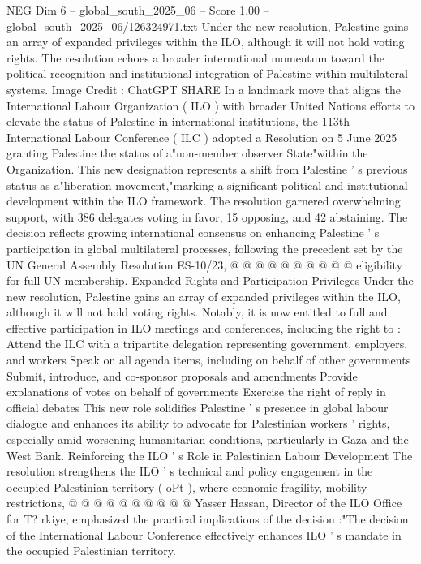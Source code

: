 \begin{textsample}{NEG Dim 6 – global\_south\_2025\_06 – Score 1.00 – global\_south\_2025\_06/126324971.txt}  \label{ex:f6_neg_435}
Under the new resolution, Palestine gains an array of expanded privileges within the ILO, although it will not hold voting rights.
The resolution echoes a broader international momentum toward the political recognition and institutional integration of Palestine within multilateral systems.
Image Credit : ChatGPT SHARE In a landmark move that aligns the International Labour Organization ( ILO ) with broader United Nations efforts to elevate the status of Palestine in international institutions, the 113th International Labour Conference ( ILC ) adopted a Resolution on 5 June 2025 granting Palestine the status of a"non-member observer State"within the Organization.
This new designation represents a shift from Palestine ' s previous status as a"liberation movement,"marking a significant political and institutional development within the ILO framework.
The resolution garnered overwhelming support, with 386 delegates voting in favor, 15 opposing, and 42 abstaining.
The decision reflects growing international consensus on enhancing Palestine ' s participation in global multilateral processes, following the precedent set by the UN General Assembly Resolution ES-10/23, @ @ @ @ @ @ @ @ @ @ eligibility for full UN membership.
Expanded Rights and Participation Privileges Under the new resolution, Palestine gains an array of expanded privileges within the ILO, although it will not hold voting rights.
Notably, it is now entitled to full and effective participation in ILO meetings and conferences, including the right to : Attend the ILC with a tripartite delegation representing government, employers, and workers Speak on all agenda items, including on behalf of other governments Submit, introduce, and co-sponsor proposals and amendments Provide explanations of votes on behalf of governments Exercise the right of reply in official debates This new role solidifies Palestine ' s presence in global labour dialogue and enhances its ability to advocate for Palestinian workers ' rights, especially amid worsening humanitarian conditions, particularly in Gaza and the West Bank.
Reinforcing the ILO ' s Role in Palestinian Labour Development The resolution strengthens the ILO ' s technical and policy engagement in the occupied Palestinian territory ( oPt ), where economic fragility, mobility restrictions, @ @ @ @ @ @ @ @ @ @ Yasser Hassan, Director of the ILO Office for T? rkiye, emphasized the practical implications of the decision :"The decision of the International Labour Conference effectively enhances ILO ' s mandate in the occupied Palestinian territory.

\end{textsample}
